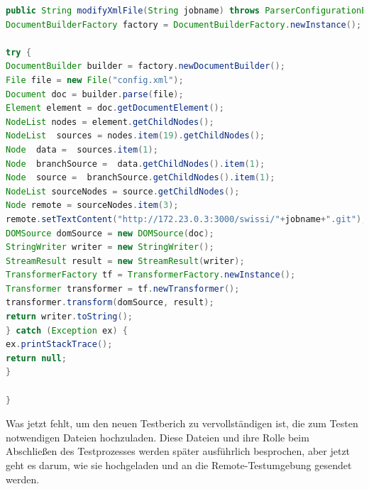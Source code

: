 \documentclass[apaper4,12p]{scrartcl}
\begin{document}
\begin{lstlisting}[language=JAVA,caption=modifyXmlFil]
public String modifyXmlFile(String jobname) throws ParserConfigurationException, SAXException, IOException {
DocumentBuilderFactory factory = DocumentBuilderFactory.newInstance();

try {
DocumentBuilder builder = factory.newDocumentBuilder();
File file = new File("config.xml");
Document doc = builder.parse(file);
Element element = doc.getDocumentElement();
NodeList nodes = element.getChildNodes();
NodeList  sources = nodes.item(19).getChildNodes();
Node  data =  sources.item(1);
Node  branchSource =  data.getChildNodes().item(1);
Node  source =  branchSource.getChildNodes().item(1);
NodeList sourceNodes = source.getChildNodes();
Node remote = sourceNodes.item(3);
remote.setTextContent("http://172.23.0.3:3000/swissi/"+jobname+".git");
DOMSource domSource = new DOMSource(doc);
StringWriter writer = new StringWriter();
StreamResult result = new StreamResult(writer);
TransformerFactory tf = TransformerFactory.newInstance();
Transformer transformer = tf.newTransformer();
transformer.transform(domSource, result);
return writer.toString();    
} catch (Exception ex) {
ex.printStackTrace();
return null;
}

}
\end{lstlisting} 
Was jetzt fehlt, um den neuen Testberich zu vervollständigen ist, die zum Testen notwendigen Dateien hochzuladen. Diese Dateien und ihre Rolle beim Abschließen des Testprozesses werden später ausführlich besprochen, aber jetzt geht es darum, wie sie hochgeladen und an die Remote-Testumgebung gesendet werden.
\end{document}
